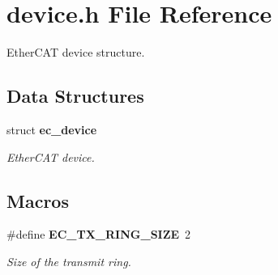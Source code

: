 \section{device.\-h File Reference}
\label{device_8h}


Ether\-C\-A\-T device structure.  


\subsection*{Data Structures}
\begin{DoxyCompactItemize}
\item 
struct {\bf ec\-\_\-device}
\begin{DoxyCompactList}\small\item\em Ether\-C\-A\-T device. \end{DoxyCompactList}\end{DoxyCompactItemize}
\subsection*{Macros}
\begin{DoxyCompactItemize}
\item 
\#define {\bf E\-C\-\_\-\-T\-X\-\_\-\-R\-I\-N\-G\-\_\-\-S\-I\-Z\-E}~2
\begin{DoxyCompactList}\small\item\em Size of the transmit ring. \end{DoxyCompactList}\end{DoxyCompactItemize}
